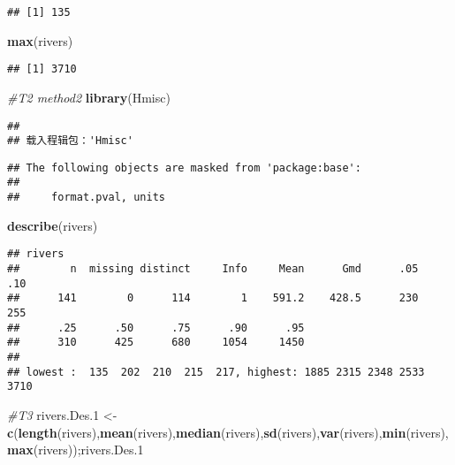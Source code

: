 \documentclass[
]{article}
\newenvironment{Shaded}{\begin{snugshade}}{\end{snugshade}}
\newcommand{\CommentTok}[1]{\textcolor[rgb]{0.56,0.35,0.01}{\textit{#1}}}
\newcommand{\FloatTok}[1]{\textcolor[rgb]{0.00,0.00,0.81}{#1}}
\newcommand{\FunctionTok}[1]{\textcolor[rgb]{0.13,0.29,0.53}{\textbf{#1}}}
\newcommand{\NormalTok}[1]{#1}
\newcommand{\OtherTok}[1]{\textcolor[rgb]{0.56,0.35,0.01}{#1}}
\begin{document}
\begin{verbatim}
## [1] 135
\end{verbatim}

\begin{Shaded}
\begin{Highlighting}[]
\FunctionTok{max}\NormalTok{(rivers)}
\end{Highlighting}
\end{Shaded}

\begin{verbatim}
## [1] 3710
\end{verbatim}

\begin{Shaded}
\begin{Highlighting}[]
\CommentTok{\#T2 method2}
\FunctionTok{library}\NormalTok{(Hmisc)}
\end{Highlighting}
\end{Shaded}

\begin{verbatim}
## 
## 载入程辑包：'Hmisc'
\end{verbatim}

\begin{verbatim}
## The following objects are masked from 'package:base':
## 
##     format.pval, units
\end{verbatim}

\begin{Shaded}
\begin{Highlighting}[]
\FunctionTok{describe}\NormalTok{(rivers)}
\end{Highlighting}
\end{Shaded}

\begin{verbatim}
## rivers 
##        n  missing distinct     Info     Mean      Gmd      .05      .10 
##      141        0      114        1    591.2    428.5      230      255 
##      .25      .50      .75      .90      .95 
##      310      425      680     1054     1450 
## 
## lowest :  135  202  210  215  217, highest: 1885 2315 2348 2533 3710
\end{verbatim}

\begin{Shaded}
\begin{Highlighting}[]
\CommentTok{\#T3}
\NormalTok{rivers.Des}\FloatTok{.1} \OtherTok{\textless{}{-}} \FunctionTok{c}\NormalTok{(}\FunctionTok{length}\NormalTok{(rivers),}\FunctionTok{mean}\NormalTok{(rivers),}\FunctionTok{median}\NormalTok{(rivers),}\FunctionTok{sd}\NormalTok{(rivers),}\FunctionTok{var}\NormalTok{(rivers),}\FunctionTok{min}\NormalTok{(rivers),}\FunctionTok{max}\NormalTok{(rivers));rivers.Des}\FloatTok{.1}
\end{Highlighting}
\end{Shaded}
\end{document}
